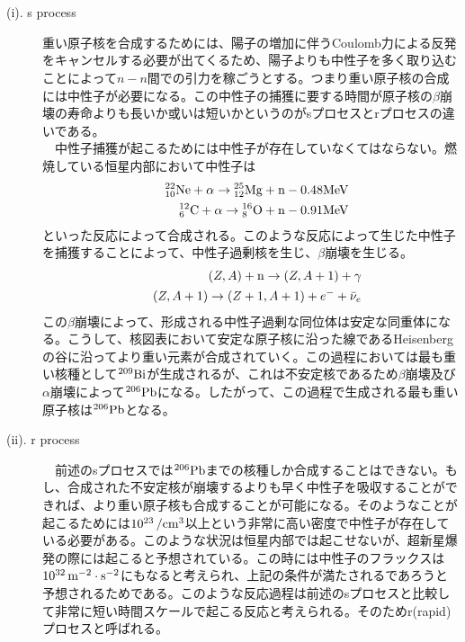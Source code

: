 \documentclass[a4j,fleqn]{jsarticle}
\begin{document}
    \section{}
        \subsection{}
        \begin{description}
            \item[(i). s process]
            重い原子核を合成するためには、陽子の増加に伴うCoulomb力による反発をキャンセルする必要が出てくるため、陽子よりも中性子を多く取り込むことによって$n-n$間での引力を稼ごうとする。つまり重い原子核の合成には中性子が必要になる。この中性子の捕獲に要する時間が原子核の$\beta$崩壊の寿命よりも長いか或いは短いかというのがsプロセスとrプロセスの違いである。\\
            　中性子捕獲が起こるためには中性子が存在していなくてはならない。燃焼している恒星内部において中性子は
            \begin{eqnarray}
                &&{}^{22}_{10}{\rm{Ne}}+\alpha\to{}^{25}_{12}{\rm{Mg}}+{\rm{n}}-0.48{\rm{MeV}}\\
                &&{}^{12}_{6}{\rm{C}}+\alpha\to{}^{16}_{8}{\rm{O}}+{\rm{n}}-0.91{\rm{MeV}}
            \end{eqnarray}
            といった反応によって合成される。このような反応によって生じた中性子を捕獲することによって、中性子過剰核を生じ、$\beta$崩壊を生じる。
            \begin{eqnarray}
                &&\left(Z,A\right)+{\rm{n}}\to\left(Z,A+1\right)+\gamma\\
                &&\left(Z,A+1\right)\to\left(Z+1,A+1\right)+e^-+\bar{\nu}_e
            \end{eqnarray}
            この$\beta$崩壊によって、形成される中性子過剰な同位体は安定な同重体になる。こうして、核図表において安定な原子核に沿った線であるHeisenbergの谷に沿ってより重い元素が合成されていく。この過程においては最も重い核種として${}^{209}{\rm{Bi}}$が生成されるが、これは不安定核であるため$\beta$崩壊及び$\alpha$崩壊によって${}^{206}{\rm{Pb}}$になる。したがって、この過程で生成される最も重い原子核は${}^{206}{\rm{Pb}}$となる。\\
            \item[(ii). r process]
            　前述のsプロセスでは${}^{206}{\rm{Pb}}$までの核種しか合成することはできない。もし、合成された不安定核が崩壊するよりも早く中性子を吸収することができれば、より重い原子核も合成することが可能になる。そのようなことが起こるためには$10^{23}\,{\rm{/cm^3}}$以上という非常に高い密度で中性子が存在している必要がある。このような状況は恒星内部では起こせないが、超新星爆発の際には起こると予想されている。この時には中性子のフラックスは$10^{32}\,{\rm{m^{-2}\cdot{s}^{-2}}}$にもなると考えられ、上記の条件が満たされるであろうと予想されるためである。このような反応過程は前述のsプロセスと比較して非常に短い時間スケールで起こる反応と考えられる。そのためr(rapid)プロセスと呼ばれる。
        \end{description}
\end{document}
